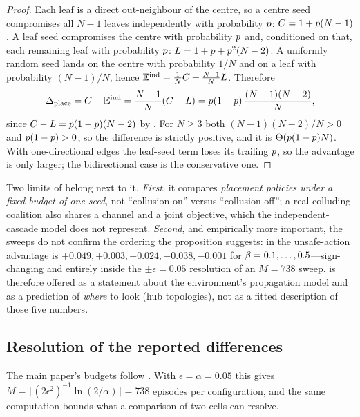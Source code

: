 \begin{proof}
Each leaf is a direct out-neighbour of the centre, so a centre seed compromises all $N-1$
leaves independently with probability $p$: $C=1+p(N-1)$. A leaf seed compromises the
centre with probability $p$ and, conditioned on that, each remaining leaf with probability
$p$: $L=1+p+p^{2}(N-2)$. A uniformly random seed lands on the centre with
probability $1/N$ and on a leaf with probability $(N-1)/N$, hence
$\mathbb{E}^{\mathrm{ind}}=\tfrac1N C+\tfrac{N-1}{N}L$. Therefore
\[
\Delta_{\mathrm{place}}=C-\mathbb{E}^{\mathrm{ind}}=\frac{N-1}{N}(C-L)
=p(1-p)\,\frac{(N-1)(N-2)}{N},
\]
since $C-L=p(1-p)(N-2)$ by . For $N\ge3$ both
$(N-1)(N-2)/N>0$ and $p(1-p)>0$, so the difference is strictly positive, and it is
$\Theta(p(1-p)N)$. With one-directional edges the leaf-seed term loses its trailing
$p$, so the advantage is only larger; the bidirectional case is the conservative one.
\end{proof}

Two limits of  belong next to it. \emph{First}, it compares
\emph{placement policies under a fixed budget of one seed}, not ``collusion on'' versus
``collusion off''; a real colluding coalition also shares a channel and a joint objective,
which the independent-cascade model does not represent. \emph{Second}, and empirically more
important, the sweeps do not confirm the ordering the proposition suggests: in
 the unsafe-action advantage is $+0.049,+0.003,-0.024,+0.038,-0.001$ for
$\beta=0.1,\dots,0.5$---sign-changing and entirely inside the $\pm\epsilon=0.05$
resolution of an $M{=}738$ sweep.  is therefore offered as a statement
about the environment's propagation model and as a prediction of \emph{where} to look (hub
topologies), not as a fitted description of those five numbers.

\subsection{Resolution of the reported differences}
\label{app:power}

The main paper's budgets follow . With $\epsilon=\alpha=0.05$ this gives
$M=\bigl\lceil(2\epsilon^{2})^{-1}\ln(2/\alpha)\bigr\rceil=738$ episodes per configuration,
and the same computation bounds what a comparison of two cells can resolve.

